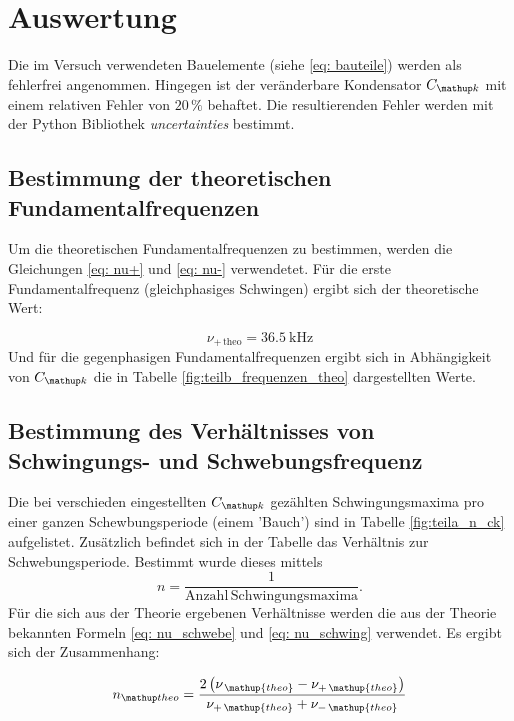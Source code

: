 \section{Auswertung}
Die im Versuch verwendeten Bauelemente (siehe \eqref{eq: bauteile})
werden als fehlerfrei angenommen.
Hingegen ist der veränderbare Kondensator $C\ua{k}$ mit
einem relativen Fehler von $20\,\%$ behaftet.
Die resultierenden Fehler werden mit der Python Bibliothek
\emph{uncertainties} bestimmt.

\subsection{Bestimmung der theoretischen Fundamentalfrequenzen}
Um die theoretischen Fundamentalfrequenzen zu bestimmen, werden die Gleichungen \eqref{eq: nu+} und
\eqref{eq: nu-} verwendetet.
Für die erste Fundamentalfrequenz (gleichphasiges Schwingen) ergibt sich der
theoretische Wert: %

\begin{equation}
\label{eq:nu_plu_theo}
\nu_{+\,\mathup{theo}}=\SI{36,5}{\kilo\hertz}
\end{equation}
Und für die gegenphasigen Fundamentalfrequenzen ergibt sich in Abhängigkeit von $C\ua{k}$ die in Tabelle \ref{fig:teilb_frequenzen_theo}  dargestellten Werte. %


\subsection{Bestimmung des Verhältnisses von Schwingungs- und Schwebungsfrequenz}
Die bei verschieden eingestellten $C\ua{k}$ gezählten Schwingungsmaxima pro einer ganzen %
Schewbungsperiode (einem 'Bauch') sind in Tabelle \ref{fig:teila_n_ck} aufgelistet. %
Zusätzlich befindet sich in der Tabelle das Verhältnis zur Schwebungsperiode. %
Bestimmt wurde dieses mittels %
\begin{equation*}
n=\frac{1}{\mathup{Anzahl \, Schwingungsmaxima}}.
\end{equation*}
Für die sich aus der Theorie ergebenen Verhältnisse werden die aus der Theorie 
bekannten Formeln \eqref{eq: nu_schwebe} und \eqref{eq: nu_schwing} verwendet.
Es ergibt sich der Zusammenhang:

\begin{equation*}
n\ua{theo}=\frac{2\left(\nu_{\,\mathup{theo}}-\nu_{+\,\mathup{theo}}\right)}{\nu_{+\,\mathup{theo}}+\nu_{-\,\mathup{theo}}}
\end{equation*}


